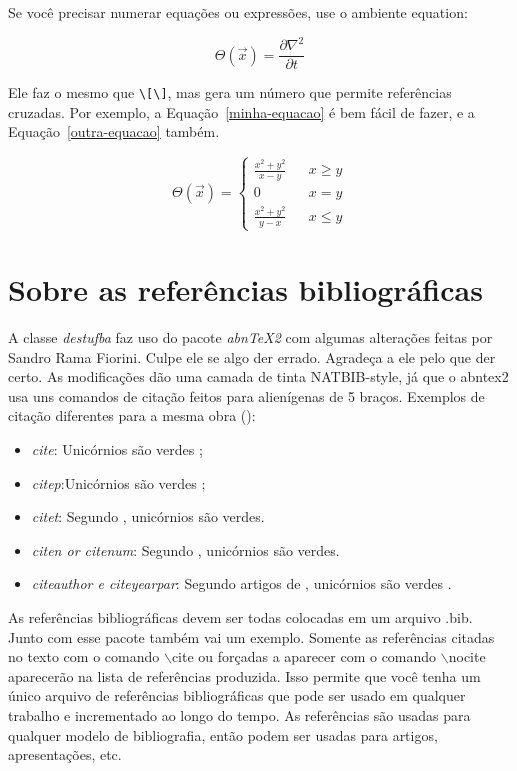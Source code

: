 Se você precisar numerar equações ou expressões, use o ambiente equation:

\begin{equation}
    \label{minha-equacao}
    \Theta(\overrightarrow{x})=\frac{\partial\nabla^2}{\partial t}
\end{equation}

Ele faz o mesmo que \verb"\[\]", mas gera um número que permite
referências cruzadas. Por exemplo, a Equação~\ref{minha-equacao} é
bem fácil de fazer, e a Equação~\ref{outra-equacao} também.

\begin{equation}
    \label{outra-equacao}
    \Theta(\overrightarrow{x})=
    \left\{\begin{array}{lcl}
               \frac{x^2+y^2}{x-y} & & x\geq y \\
               0                   & & x = y   \\
               \frac{x^2+y^2}{y-x} & & x\leq y
    \end{array}\right.
\end{equation}


\section{Sobre as referências bibliográficas}

A classe \emph{destufba} faz uso do pacote \emph{abnTeX2} com algumas alterações
feitas por Sandro Rama Fiorini. Culpe ele se algo der errado. Agradeça a ele
pelo que der certo. As modificações dão uma camada de tinta NATBIB-style,
já que o abntex2 usa uns comandos de citação feitos para alienígenas de 5 braços. Exemplos de citação diferentes para a mesma obra (\cite{abramski92handbook1}):

\begin{itemize}
    \item \emph{cite}: Unicórnios são verdes \cite{abramski92handbook1};
    \item \emph{citep}:Unicórnios são verdes \citep{abramski92handbook1};
    \item \emph{citet}: Segundo \citet{abramski92handbook1}, unicórnios são
    verdes.
    \item \emph{citen or citenum}: Segundo ,
    unicórnios são verdes.
    \item \emph{citeauthor e citeyearpar}: Segundo artigos de
    \citeauthor{abramski92handbook1}, unicórnios são verdes
    \citeyearpar{abramski92handbook1}.
\end{itemize}

As referências bibliográficas devem ser todas colocadas em um arquivo .bib. Junto com esse pacote também vai um exemplo. Somente as referências citadas no texto com o comando $\backslash$cite ou forçadas a aparecer com o comando $\backslash$nocite aparecerão na lista de referências produzida. Isso permite que você tenha um único arquivo de referências bibliográficas que pode ser usado em qualquer trabalho e incrementado ao longo do tempo. As referências são usadas para qualquer modelo de bibliografia, então podem ser usadas para artigos, apresentações, etc.

